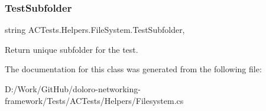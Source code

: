 \subsubsection{\texorpdfstring{Test\+Subfolder}{TestSubfolder}}
{\footnotesize\ttfamily string A\+C\+Tests.\+Helpers.\+File\+System.\+Test\+Subfolder\hspace{0.3cm}{\ttfamily [static]}, {\ttfamily [get]}}



Return unique subfolder for the test. 



The documentation for this class was generated from the following file\+:\begin{DoxyCompactItemize}
\item 
D\+:/\+Work/\+Git\+Hub/doloro-\/networking-\/framework/\+Tests/\+A\+C\+Tests/\+Helpers/Filesystem.\+cs\end{DoxyCompactItemize}
